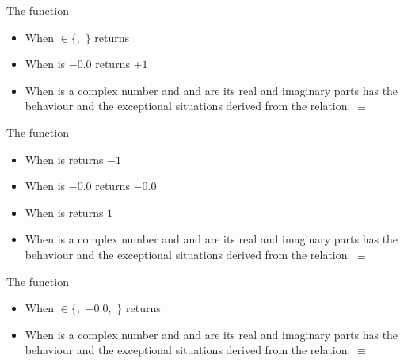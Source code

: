 \documentclass[../Exponentials-Logarithms-Trigonometry.tex]{subfiles}
\begin{document}
\noindent
The function 
\begin{itemize}
  \item When  $\in \{$$,$
  $\}$ returns 
  \item When  is $-0.0$ returns $+1$
  \item When  is a complex number and   and 
  are its real and imaginary parts has the behaviour and the exceptional
  situations derived from the relation: \code{)}
  $\equiv$ \code{ (-
  }\code{)))}
\end{itemize}

\noindent
The function 
\begin{itemize}
  \item When  is  returns
  $-1$
  \item When  is $-0.0$ returns $-0.0$
  \item When  is  returns
  $1$
  \item When  is a complex number and   and 
  are its real and imaginary parts has the behaviour and the exceptional
  situations derived from the relation: \code{)}
  $\equiv$ \code{ (-
  }\code{)))}
\end{itemize}

\noindent
The function 
\begin{itemize}
  \item When  $\in \{$$,$
  $-0.0$$,$ $\}$ returns 
  \item When  is a complex number and   and 
  are its real and imaginary parts has the behaviour and the exceptional
  situations derived from the relation: \code{)}
  $\equiv$ \code{ (-
  }\code{)))}
\end{itemize}
\end{document}
